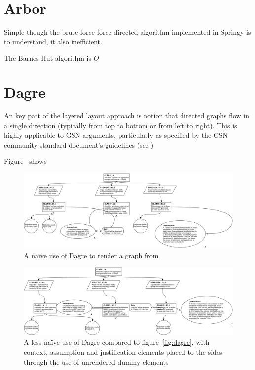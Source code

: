 \section{Arbor}

Simple though the brute-force force directed algorithm implemented in Springy is to understand, it also inefficient.

The Barnes-Hut algorithm is $O$



\section{Dagre}

An key part of the layered layout approach is notion that directed graphs flow in a single direction (typically from top to bottom or from left to right). This is highly applicable to GSN arguments, particularly as specified by the GSN community standard document's guidelines \cite{gsnspec} (see )

Figure~ shows

\begin{figure}
  \centering
  \includegraphics[width=\textwidth]{graphics/results/dagre.png}
  \caption{A na\"ive use of Dagre to render a graph from \cite{aldenthesis}}
  \label{fig:dagre1}
\end{figure}



\begin{figure}
  \centering
  \includegraphics[width=\textwidth]{graphics/results/dagre-enhanced.png}
  \caption{A less na\"ive use of Dagre compared to figure~\ref{fig:dagre}, with context, assumption and justification elements placed to the sides through the use of unrendered dummy elements}
  \label{fig:dagre2}
\end{figure}



